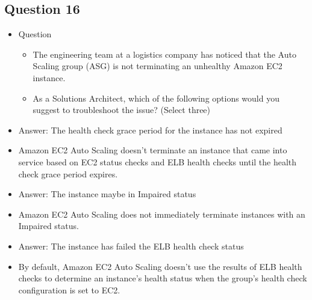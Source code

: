 \documentclass[]{scrartcl}
\begin{document}
\subsection{Question 16}
\begin{itemize}
	\item Question
	\begin{itemize}
		\item The engineering team at a logistics company has noticed that the Auto Scaling group (ASG) is not terminating an unhealthy Amazon EC2 instance.
		\item As a Solutions Architect, which of the following options would you suggest to troubleshoot the issue? (Select three)
	\end{itemize}
	\item Answer: The health check grace period for the instance has not expired
	\item Amazon EC2 Auto Scaling doesn't terminate an instance that came into service based on EC2 status checks and ELB health checks until the health check grace period expires.
	\item Answer: The instance maybe in Impaired status
	\item Amazon EC2 Auto Scaling does not immediately terminate instances with an Impaired status.
	\item Answer: The instance has failed the ELB health check status
	\item By default, Amazon EC2 Auto Scaling doesn't use the results of ELB health checks to determine an instance's health status when the group's health check configuration is set to EC2. 
\end{itemize}
\end{document}
